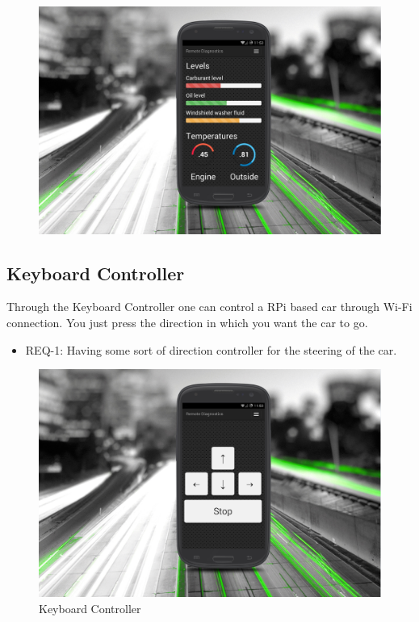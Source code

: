 \documentclass{scrreprt}
\begin{document}
\begin{figure}[!htbp]
\center
\includegraphics[width=1\textwidth]{./img/firstPage.jpg}
\end{figure}


\subsection{Keyboard Controller}
 
Through the Keyboard Controller one can control a RPi based car through Wi-Fi connection.
You just press the direction in which you want the car to go.
 
\begin{itemize}
\item REQ-1: Having some sort of direction controller for the steering of the car.
\end{itemize}
 
\begin{figure}[!htbp]
\center
\includegraphics[width=1\textwidth]{./img/keyboardController.jpg}
Keyboard Controller
\end{figure}
\end{document}
